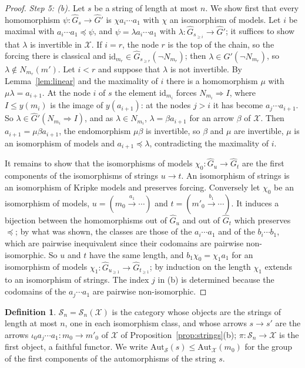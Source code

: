 \documentclass[11pt]{amsart}
\theoremstyle{definition}
\newtheorem{defi}[thm]{Definition}
\newcommand{\Aut}{\mathrm{Aut}}
\newcommand{\cX}{\mathcal X}
\newcommand{\cS}{\mathcal S}
\newcommand{\id}{\mathrm{id}}
\begin{document}
\begin{proof}
\emph{Step 5: (b).} Let $s$ be a string of length at most $n$. We show
first that every homomorphism $\psi\colon\hat G_s\to\hat G'$ is
$\chi a_i\cdots a_1$ with $\chi$ an isomorphism of models. Let $i$ be
maximal with $a_i\cdots a_1\preceq\psi$, and $\psi=\lambda a_i\cdots
a_1$ with $\lambda\colon\hat G_{s_{\ge i}}\to\hat G'$; it suffices to
show that $\lambda$ is invertible in $\cX$. If $i=r$, the node $r$ is
the top of the chain, so the forcing there is classical and $\id_{m_r}
\in\hat G_{s_{\ge r}}(\neg N_{m_r})$; then $\lambda\in\hat G'(\neg
N_{m_r})$, so $\lambda\notin N_{m_r}(m')$. Let $i<r$ and suppose that
$\lambda$ is not invertible. By Lemma~\ref{lem:linear} and the
maximality of $i$ there is a homomorphism $\mu$ with $\mu\lambda=
a_{i+1}$. At the node $i$ of $s$ the element $\id_{m_i}$ forces
$N_{m_i}\Rightarrow I$, where $I\le y(m_i)$ is the image of
$y(a_{i+1})$: at the nodes $j>i$ it has become $a_j\cdots a_{i+1}$.
So $\lambda\in\hat G'(N_{m_i}\Rightarrow I)$, and as $\lambda\in
N_{m_i}$, $\lambda=\beta a_{i+1}$ for an arrow $\beta$ of $\cX$. Then
$a_{i+1}=\mu\beta a_{i+1}$, the endomorphism $\mu\beta$ is invertible,
so $\beta$ and $\mu$ are invertible, $\mu$ is an isomorphism of models
and $a_{i+1}\preceq\lambda$, contradicting the maximality of $i$.

It remains to show that the isomorphisms of models $\chi_0\colon\hat
G_u\to\hat G_t$ are the first components of the isomorphisms of
strings $u\to t$. An isomorphism of strings is an isomorphism of
Kripke models and preserves forcing. Conversely let $\chi_0$ be an
isomorphism of models, $u=(m_0\xrightarrow{a_1}\cdots)$ and
$t=(m'_0\xrightarrow{b_1}\cdots)$. It induces a bijection between the
homomorphisms out of $\hat G_u$ and out of $\hat G_t$ which preserves
$\preceq$; by what was shown, the classes are those of the $a_i\cdots
a_1$ and of the $b_i\cdots b_1$, which are pairwise inequivalent since
their codomains are pairwise non-isomorphic. So $u$ and $t$ have the
same length, and $b_1\chi_0=\chi_1a_1$ for an isomorphism of models
$\chi_1\colon\hat G_{u_{\ge1}}\to\hat G_{t_{\ge1}}$; by induction on
the length $\chi_1$ extends to an isomorphism of strings. The index
$j$ in (b) is determined because the codomains of the $a_j\cdots a_1$
are pairwise non-isomorphic.
\end{proof}

\begin{defi}
$\cS_n=\cS_n(\cX)$ is the category whose objects are the strings of
length at most $n$, one in each isomorphism class, and whose arrows
$s\to s'$ are the arrows $\iota_0a_j\cdots a_1\colon m_0\to m'_0$ of
$\cX$ of Proposition~\ref{prop:strings}(b); $\pi\colon\cS_n\to\cX$ is
the first object, a faithful functor. We write $\Aut_{\cS}(s)\le
\Aut_{\cX}(m_0)$ for the group of the first components of the
automorphisms of the string $s$.
\end{defi}
\end{document}
